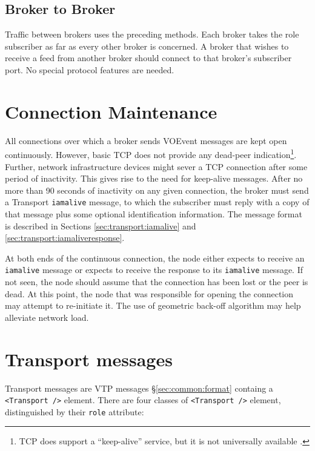 \documentclass[a4paper,11pt]{ivoa}
\begin{document}
\subsection{Broker to Broker}
\label{sec:node:brokertobroker}

Traffic between brokers uses the preceding methods. Each broker takes the role
subscriber as far as every other broker is concerned. A broker that wishes to
receive a feed from another broker should connect to that broker's subscriber
port. No special protocol features are needed.

\section{Connection Maintenance}
\label{sec:maintenance}

All connections over which a broker sends VOEvent messages are kept open
continuously. However, basic TCP does not provide any dead-peer
indication\footnote{ TCP does support a ``keep-alive'' service, but it is not
universally available \citep{Braden:1989}.}. Further, network infrastructure
devices might sever a TCP connection after some period of inactivity. This
gives rise to the need for keep-alive messages. After no more than 90 seconds
of inactivity on any given connection, the broker must send a Transport
\texttt{iamalive} message, to which the subscriber must reply with a copy of
that message plus some optional identification information. The message format
is described in Sections \ref{sec:transport:iamalive} and
\ref{sec:transport:iamaliveresponse}.

At both ends of the continuous connection, the node either expects to receive
an \texttt{iamalive} message or expects to receive the response to its
\texttt{iamalive} message. If not seen, the node should assume that the
connection has been lost or the peer is dead. At this point, the node that was
responsible for opening the connection may attempt to re-initiate it. The use
of geometric back-off algorithm may help alleviate network load.

\section{Transport messages}
\label{sec:transport}

Transport messages are VTP messages \S\ref{sec:common:format} containg a
\texttt{<Transport~/>} element. There are four classes of
\texttt{<Transport~/>} element, distinguished by their \texttt{role}
attribute:
\end{document}

